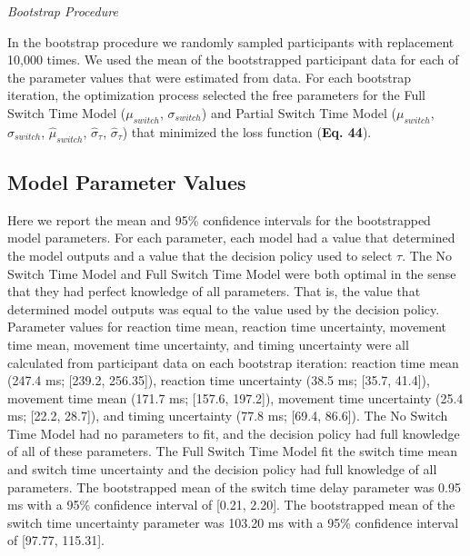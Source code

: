 \documentclass[12pt]{article}
\newcommand\boldblue[1]{\textcolor{mydarkblue}{\textbf{#1}}}
\begin{document}
\vspace{2mm}
\noindent\emph{Bootstrap Procedure}

\noindent In the bootstrap procedure we randomly sampled participants with replacement 10,000 times\autocite*{cashabackGradientReinforcementLandscape2019a, cashabackDissociatingErrorbasedReinforcementbased2017,rothReinforcementbasedProcessesActively2023,rothPunishmentLeadsGreater2024}. We used the mean of the bootstrapped participant data for each of the parameter values that were estimated from data. For each bootstrap iteration, the optimization process selected the free parameters for the Full Switch Time Model ($\mu_{switch}$, $\sigma_{switch}$) and Partial Switch Time Model ($\mu_{switch}$, $\sigma_{switch}$, $\hat{\mu}_{switch}$, $\hat{\sigma}_{\tau}$, $\hat{\sigma}_{\tau}$) that minimized the loss function (\boldblue{Eq. 44}).

\vspace{2mm}
\subsection{Model Parameter Values}

\noindent Here we report the mean and 95\% confidence intervals for the bootstrapped model parameters. For each parameter, each model had a value that determined the model outputs and a value that the decision policy used to select $\tau$. The No Switch Time Model and Full Switch Time Model were both optimal in the sense that they had perfect knowledge of all parameters. That is, the value that determined model outputs was equal to the value used by the decision policy. Parameter values for reaction time mean, reaction time uncertainty, movement time mean, movement time uncertainty, and timing uncertainty were all calculated from participant data on each bootstrap iteration: reaction time mean (247.4 ms; [239.2, 256.35]), reaction time uncertainty (38.5 ms; [35.7, 41.4]), movement time mean (171.7 ms; [157.6, 197.2]), movement time uncertainty (25.4 ms; [22.2, 28.7]), and timing uncertainty (77.8 ms; [69.4, 86.6]). The No Switch Time Model had no parameters to fit, and the decision policy had full knowledge of all of these parameters. The Full Switch Time Model fit the switch time mean and switch time uncertainty and the decision policy had full knowledge of all parameters. The bootstrapped mean of the switch time delay parameter was 0.95 ms with a 95\% confidence interval of [0.21, 2.20]. The bootstrapped mean of the switch time uncertainty parameter was 103.20 ms with a 95\% confidence interval of [97.77, 115.31].
\end{document}
